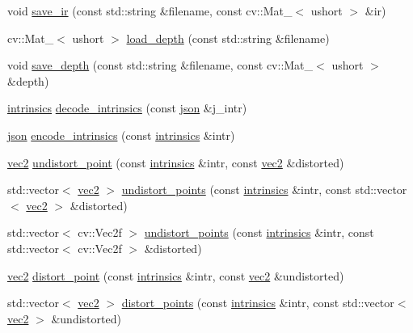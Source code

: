 \begin{DoxyCompactItemize}
\item 
void \hyperlink{namespacetlz_a118330168f0a4fa1217373190a9e6018}{save\+\_\+ir} (const std\+::string \&filename, const cv\+::\+Mat\+\_\+$<$ ushort $>$ \&ir)
\item 
cv\+::\+Mat\+\_\+$<$ ushort $>$ \hyperlink{namespacetlz_a55912f12ae3521ac51a3d4ab3d75183a}{load\+\_\+depth} (const std\+::string \&filename)
\item 
void \hyperlink{namespacetlz_a368c5ff91078bfc7c2584e90c147f953}{save\+\_\+depth} (const std\+::string \&filename, const cv\+::\+Mat\+\_\+$<$ ushort $>$ \&depth)
\item 
\hyperlink{structtlz_1_1intrinsics}{intrinsics} \hyperlink{namespacetlz_a8cba4853d0d796a01c72f59f36f2a492}{decode\+\_\+intrinsics} (const \hyperlink{namespacetlz_ac400657dfcddf6309a769aefc23eed0c}{json} \&j\+\_\+intr)
\item 
\hyperlink{namespacetlz_ac400657dfcddf6309a769aefc23eed0c}{json} \hyperlink{namespacetlz_a46c3e46d56bc36cf6b1236522563bc4a}{encode\+\_\+intrinsics} (const \hyperlink{structtlz_1_1intrinsics}{intrinsics} \&intr)
\item 
\hyperlink{namespacetlz_ae192989bfbe6c700ac84d2a8cf05ebb4}{vec2} \hyperlink{namespacetlz_a67f7411515a0538e3a39b9d0602ed854}{undistort\+\_\+point} (const \hyperlink{structtlz_1_1intrinsics}{intrinsics} \&intr, const \hyperlink{namespacetlz_ae192989bfbe6c700ac84d2a8cf05ebb4}{vec2} \&distorted)
\item 
std\+::vector$<$ \hyperlink{namespacetlz_ae192989bfbe6c700ac84d2a8cf05ebb4}{vec2} $>$ \hyperlink{namespacetlz_a8b5e4acbb884887859e414ffe06a09f8}{undistort\+\_\+points} (const \hyperlink{structtlz_1_1intrinsics}{intrinsics} \&intr, const std\+::vector$<$ \hyperlink{namespacetlz_ae192989bfbe6c700ac84d2a8cf05ebb4}{vec2} $>$ \&distorted)
\item 
std\+::vector$<$ cv\+::\+Vec2f $>$ \hyperlink{namespacetlz_a6280e1948639b2ce3463810663036f8c}{undistort\+\_\+points} (const \hyperlink{structtlz_1_1intrinsics}{intrinsics} \&intr, const std\+::vector$<$ cv\+::\+Vec2f $>$ \&distorted)
\item 
\hyperlink{namespacetlz_ae192989bfbe6c700ac84d2a8cf05ebb4}{vec2} \hyperlink{namespacetlz_aa0b38daa346fbb57c8f6668de69ea2d1}{distort\+\_\+point} (const \hyperlink{structtlz_1_1intrinsics}{intrinsics} \&intr, const \hyperlink{namespacetlz_ae192989bfbe6c700ac84d2a8cf05ebb4}{vec2} \&undistorted)
\item 
std\+::vector$<$ \hyperlink{namespacetlz_ae192989bfbe6c700ac84d2a8cf05ebb4}{vec2} $>$ \hyperlink{namespacetlz_ab01b1e8009a6b2ae9fe0fd559de7dd20}{distort\+\_\+points} (const \hyperlink{structtlz_1_1intrinsics}{intrinsics} \&intr, const std\+::vector$<$ \hyperlink{namespacetlz_ae192989bfbe6c700ac84d2a8cf05ebb4}{vec2} $>$ \&undistorted)

\end{DoxyCompactItemize}
